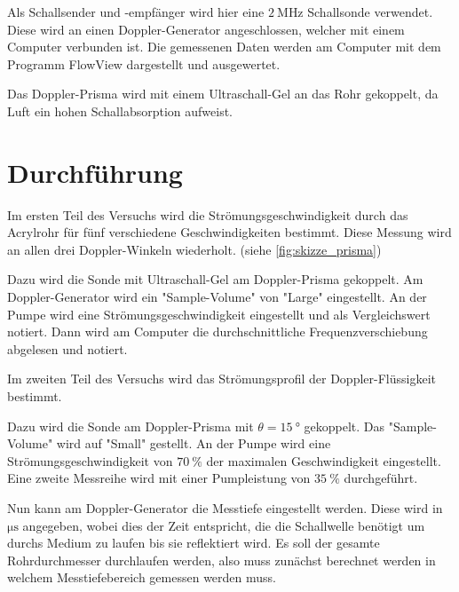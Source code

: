 Als Schallsender und -empfänger wird hier eine $\SI{2}{\mega\hertz}$ Schallsonde verwendet.
Diese wird an einen Doppler-Generator angeschlossen, welcher mit einem Computer verbunden ist.
Die gemessenen Daten werden am Computer mit dem Programm FlowView dargestellt und ausgewertet.

Das Doppler-Prisma wird mit einem Ultraschall-Gel an das Rohr gekoppelt, da Luft ein hohen Schallabsorption aufweist.


\section{Durchführung}
\label{sec:Durchführung}

Im ersten Teil des Versuchs wird die Strömungsgeschwindigkeit durch das Acrylrohr für fünf verschiedene Geschwindigkeiten bestimmt. 
Diese Messung wird an allen drei Doppler-Winkeln wiederholt. (siehe \autoref{fig:skizze_prisma})

Dazu wird die Sonde mit Ultraschall-Gel am Doppler-Prisma gekoppelt.
Am Doppler-Generator wird ein "Sample-Volume" von "Large" eingestellt.
An der Pumpe wird eine Strömungsgeschwindigkeit eingestellt und als Vergleichswert notiert.
Dann wird am Computer die durchschnittliche Frequenzverschiebung abgelesen und notiert.

Im zweiten Teil des Versuchs wird das Strömungsprofil der Doppler-Flüssigkeit bestimmt.

Dazu wird die Sonde am Doppler-Prisma mit $\theta=\SI{15}{\degree}$ gekoppelt.
Das "Sample-Volume" wird auf "Small" gestellt.
An der Pumpe wird eine Strömungsgeschwindigkeit von $\SI{70}{\percent}$ der maximalen Geschwindigkeit eingestellt.
Eine zweite Messreihe wird mit einer Pumpleistung von $\SI{35}{\percent}$ durchgeführt.

Nun kann am Doppler-Generator die Messtiefe eingestellt werden.
Diese wird in $\si{\micro\second}$ angegeben, wobei dies der Zeit entspricht, die die Schallwelle benötigt um durchs Medium zu laufen bis sie reflektiert wird.
Es soll der gesamte Rohrdurchmesser durchlaufen werden, also muss zunächst berechnet werden in welchem Messtiefebereich gemessen werden muss.

